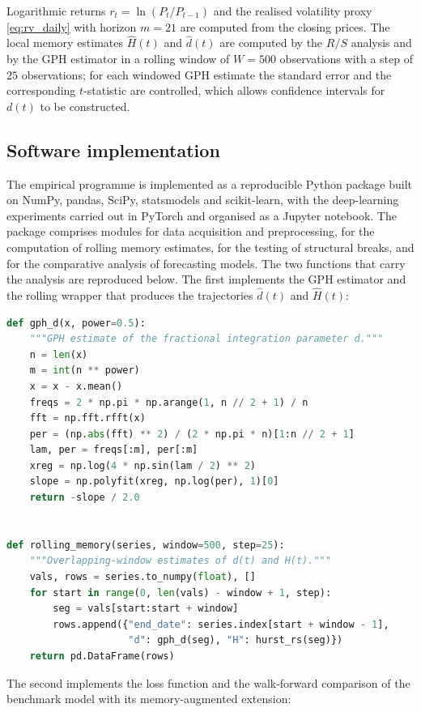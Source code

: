 \documentclass[journal]{IEEEtran}
\begin{document}
Logarithmic returns $r_t=\ln(P_t/P_{t-1})$ and the realised volatility proxy \eqref{eq:rv_daily}
with horizon $m=21$ are computed from the closing prices. The local memory estimates
$\hat H(t)$ and $\hat d(t)$ are computed by the $R/S$ analysis and by the GPH estimator in a
rolling window of $W=500$ observations with a step of $25$ observations; for each windowed GPH
estimate the standard error and the corresponding $t$-statistic are controlled, which allows
confidence intervals for $d(t)$ to be constructed.

\subsection{Software implementation}

The empirical programme is implemented as a reproducible Python package built on NumPy, pandas,
SciPy, statsmodels and scikit-learn, with the deep-learning experiments carried out in PyTorch
and organised as a Jupyter notebook. The package comprises modules for data acquisition and
preprocessing, for the computation of rolling memory estimates, for the testing of structural
breaks, and for the comparative analysis of forecasting models. The two functions that carry the
analysis are reproduced below. The first implements the GPH estimator and the rolling wrapper
that produces the trajectories $\hat d(t)$ and $\hat H(t)$:

\begin{lstlisting}[language=Python,caption={Rolling memory estimates: GPH and rescaled range}]
def gph_d(x, power=0.5):
    """GPH estimate of the fractional integration parameter d."""
    n = len(x)
    m = int(n ** power)
    x = x - x.mean()
    freqs = 2 * np.pi * np.arange(1, n // 2 + 1) / n
    fft = np.fft.rfft(x)
    per = (np.abs(fft) ** 2) / (2 * np.pi * n)[1:n // 2 + 1]
    lam, per = freqs[:m], per[:m]
    xreg = np.log(4 * np.sin(lam / 2) ** 2)
    slope = np.polyfit(xreg, np.log(per), 1)[0]
    return -slope / 2.0


def rolling_memory(series, window=500, step=25):
    """Overlapping-window estimates of d(t) and H(t)."""
    vals, rows = series.to_numpy(float), []
    for start in range(0, len(vals) - window + 1, step):
        seg = vals[start:start + window]
        rows.append({"end_date": series.index[start + window - 1],
                     "d": gph_d(seg), "H": hurst_rs(seg)})
    return pd.DataFrame(rows)
\end{lstlisting}

The second implements the loss function and the walk-forward comparison of the benchmark model
with its memory-augmented extension:
\end{document}
